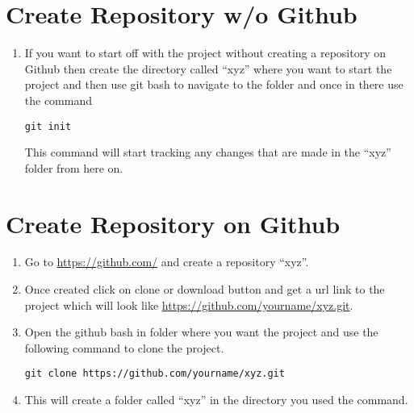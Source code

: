 \documentclass[paper=a4, fontsize=12pt]{scrartcl}
\begin{document}
\section*{Create Repository w/o Github}
\begin{enumerate}
\item If you want to start off with the project without creating a repository on Github then create the directory called ``xyz'' where you want to start the project and then use git bash to navigate to the folder and once in there use the command
\begin{lstlisting}
git init
\end{lstlisting}
This command will start tracking any changes that are made in the ``xyz'' folder from here on.
\end{enumerate}

\section*{Create Repository on Github}
\begin{enumerate}
\item Go to \url{https://github.com/} and create a repository ``xyz''.
\item Once created click on clone or download button and get a url link to the project which will look like \url{https://github.com/yourname/xyz.git}.
\item Open the github bash in folder where you want the project and use the following command to clone the project.
\begin{lstlisting}
git clone https://github.com/yourname/xyz.git
\end{lstlisting}
\item This will create a folder called ``xyz'' in the directory you used the command.
\end{enumerate}
\end{document}

